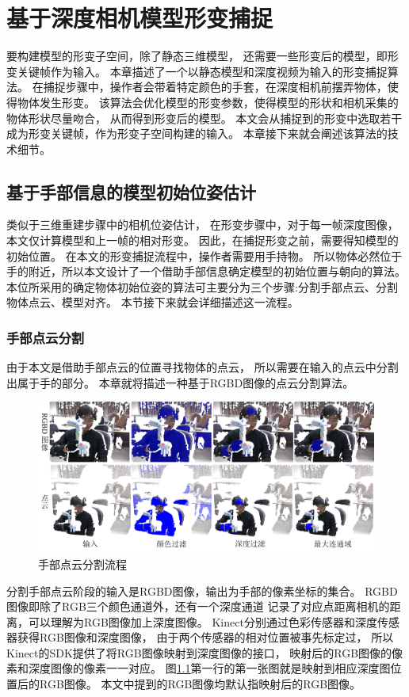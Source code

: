 \chapter{基于深度相机模型形变捕捉}
要构建模型的形变子空间，除了静态三维模型，
还需要一些形变后的模型，即形变关键帧作为输入。
本章描述了一个以静态模型和深度视频为输入的形变捕捉算法。
在捕捉步骤中，操作者会带着特定颜色的手套，在深度相机前摆弄物体，使得物体发生形变。
该算法会优化模型的形变参数，使得模型的形状和相机采集的物体形状尽量吻合，
从而得到形变后的模型。
本文会从捕捉到的形变中选取若干成为形变关键帧，作为形变子空间构建的输入。
本章接下来就会阐述该算法的技术细节。

\section{基于手部信息的模型初始位姿估计}

 类似于三维重建步骤中的相机位姿估计，
 在形变步骤中，对于每一帧深度图像，本文仅计算模型和上一帧的相对形变。
 因此，在捕捉形变之前，需要得知模型的初始位置。
 在本文的形变捕捉流程中，操作者需要用手持物。
 所以物体必然位于手的附近，所以本文设计了一个借助手部信息确定模型的初始位置与朝向的算法。
 本位所采用的确定物体初始位姿的算法可主要分为三个步骤:分割手部点云、分割物体点云、模型对齐。
 本节接下来就会详细描述这一流程。

\subsection{手部点云分割}
由于本文是借助手部点云的位置寻找物体的点云，
所以需要在输入的点云中分割出属于手的部分。
本章就将描述一种基于RGBD图像的点云分割算法。
\begin{figure}[h]
    \centering
    \includegraphics[width = \textwidth]{./Pictures/FindingHand.png}
    \caption{手部点云分割流程}
    \label{finding_hand}
\end{figure}
分割手部点云阶段的输入是RGBD图像，输出为手部的像素坐标的集合。
RGBD图像即除了RGB三个颜色通道外，还有一个深度通道
记录了对应点距离相机的距离，可以理解为RGB图像加上深度图像。
Kinect分别通过色彩传感器和深度传感器获得RGB图像和深度图像，
由于两个传感器的相对位置被事先标定过，
所以Kinect的SDK提供了将RGB图像映射到深度图像的接口，
映射后的RGB图像的像素和深度图像的像素一一对应。
图\ref{finding_hand}第一行的第一张图就是映射到相应深度图位置后的RGB图像。
本文中提到的RGB图像均默认指映射后的RGB图像。

